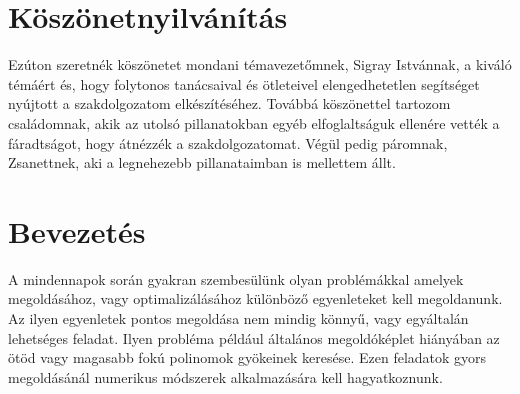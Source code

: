 \documentclass[a4paper,12pt]{report}
\begin{document}
	\setcounter{page}{1}











%
%











	\chapter*{Köszönetnyilvánítás}
		Ezúton szeretnék köszönetet mondani témavezetőmnek, Sigray Istvánnak, a kiváló témáért és, hogy folytonos tanácsaival és ötleteivel elengedhetetlen segítséget nyújtott a szakdolgozatom elkészítéséhez. Továbbá köszönettel tartozom családomnak, akik az utolsó pillanatokban egyéb elfoglaltságuk ellenére vették a fáradtságot, hogy átnézzék a szakdolgozatomat. Végül pedig páromnak, Zsanettnek, aki a legnehezebb pillanataimban is mellettem állt.












%
%











	\chapter{Bevezetés}
		A mindennapok során gyakran szembesülünk olyan problémákkal amelyek megoldásához, vagy optimalizálásához különböző egyenleteket kell megoldanunk. Az ilyen egyenletek pontos megoldása nem mindig könnyű, vagy egyáltalán lehetséges feladat. Ilyen probléma például általános megoldóképlet hiányában az ötöd vagy magasabb fokú polinomok gyökeinek keresése. Ezen feladatok gyors megoldásánál numerikus módszerek alkalmazására kell hagyatkoznunk.
\end{document}

